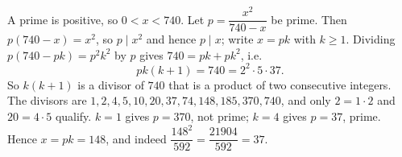 A prime is positive, so $0<x<740$. Let $p=\dfrac{x^2}{740-x}$ be prime. Then $p(740-x)=x^2$, so $p\mid x^2$ and hence $p\mid x$; write $x=pk$ with $k\ge1$. Dividing $p(740-pk)=p^2k^2$ by $p$ gives $740=pk+pk^2$, i.e.
\[pk(k+1)=740=2^2\cdot5\cdot37.\]
So $k(k+1)$ is a divisor of $740$ that is a product of two consecutive integers. The divisors are $1,2,4,5,10,20,37,74,148,185,370,740$, and only $2=1\cdot2$ and $20=4\cdot5$ qualify. $k=1$ gives $p=370$, not prime; $k=4$ gives $p=37$, prime. Hence $x=pk=\boxed{148}$, and indeed $\dfrac{148^2}{592}=\dfrac{21904}{592}=37$.
